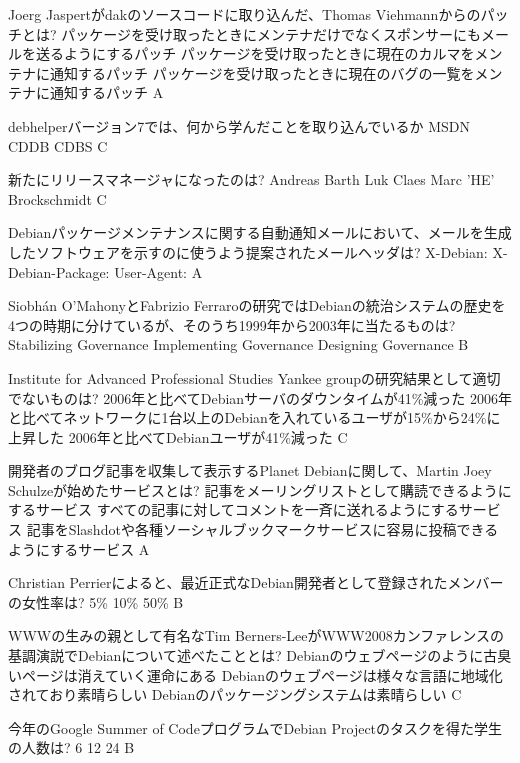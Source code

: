 \documentclass[cjk,dvipdfmx,12pt]{beamer}
\begin{document}
 \santaku
 {Joerg Jaspertがdakのソースコードに取り込んだ、Thomas Viehmannからのパッチとは?}
 {パッケージを受け取ったときにメンテナだけでなくスポンサーにもメールを送るようにするパッチ}
 {パッケージを受け取ったときに現在のカルマをメンテナに通知するパッチ}
 {パッケージを受け取ったときに現在のバグの一覧をメンテナに通知するパッチ}
 {A}
 
 \santaku
 {debhelperバージョン7では、何から学んだことを取り込んでいるか}
 {MSDN}
 {CDDB}
 {CDBS}
 {C}
 
 \santaku
 {新たにリリースマネージャになったのは?}
 {Andreas Barth}
 {Luk Claes}
 {Marc 'HE' Brockschmidt}
 {C}
 
 \santaku
 {Debianパッケージメンテナンスに関する自動通知メールにおいて、メールを生成したソフトウェアを示すのに使うよう提案されたメールヘッダは?}
 {X-Debian:}
 {X-Debian-Package:}
 {User-Agent:}
 {A}
 
 \santaku
 {Siobh\'an O'MahonyとFabrizio Ferraroの研究ではDebianの統治システムの歴史を4つの時期に分けているが、そのうち1999年から2003年に当たるものは?}
 {Stabilizing Governance}%
 {Implementing Governance}%
 {Designing Governance}%
 {B}
 
 \santaku
 {Institute for Advanced Professional Studies Yankee groupの研究結果として適切でないものは?}
 {2006年と比べてDebianサーバのダウンタイムが41\%{}減った}
 {2006年と比べてネットワークに1台以上のDebianを入れているユーザが15\%{}から24\%{}に上昇した}
 {2006年と比べてDebianユーザが41\%{}減った}
 {C}
 
 \santaku
 {開発者のブログ記事を収集して表示するPlanet Debianに関して、Martin Joey Schulzeが始めたサービスとは?}
 {記事をメーリングリストとして購読できるようにするサービス}
 {すべての記事に対してコメントを一斉に送れるようにするサービス}
 {記事をSlashdotや各種ソーシャルブックマークサービスに容易に投稿できるようにするサービス}
 {A}
 
 \santaku
 {Christian Perrierによると、最近正式なDebian開発者として登録されたメンバーの女性率は?}
 {5\%{}}
 {10\%{}}
 {50\%{}}
 {B}

 \santaku
 {WWWの生みの親として有名なTim Berners-LeeがWWW2008カンファレンスの基調演説でDebianについて述べたこととは?}
 {Debianのウェブページのように古臭いページは消えていく運命にある}
 {Debianのウェブページは様々な言語に地域化されており素晴らしい}
 {Debianのパッケージングシステムは素晴らしい}
 {C}
 
 \santaku
 {今年のGoogle Summer of CodeプログラムでDebian Projectのタスクを得た学生の人数は?}
 {6}
 {12}
 {24}
 {B}
 
\end{document}
